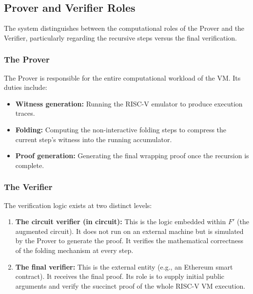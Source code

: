 \subsection{Prover and Verifier Roles}

The system distinguishes between the computational roles of the Prover and the
Verifier, particularly regarding the recursive steps versus the final verification.

\subsubsection{The Prover}

The Prover is responsible for the entire computational workload of the VM. Its duties include:

\begin{itemize}
	\item \textbf{Witness generation:} Running the RISC-V emulator to produce execution traces.
	\item \textbf{Folding:} Computing the non-interactive folding steps to compress the current step's witness into the running accumulator.
	\item \textbf{Proof generation:} Generating the final wrapping proof once the recursion is complete.
\end{itemize}

\subsubsection{The Verifier}

The verification logic exists at two distinct levels:

\begin{enumerate}
	\item \textbf{The circuit verifier (in circuit):} This is the logic
	      embedded within $F'$ (the augmented circuit). It does not run on an
	      external machine but is simulated by the Prover to generate the proof.
	      It verifies the mathematical correctness of the folding mechanism at every step.
	\item \textbf{The final verifier:} This is the external entity (e.g., an
	      Ethereum smart contract). It receives the final proof. Its role is to
	      supply initial public arguments and verify the succinct proof of the
	      whole RISC-V VM execution.
\end{enumerate}
